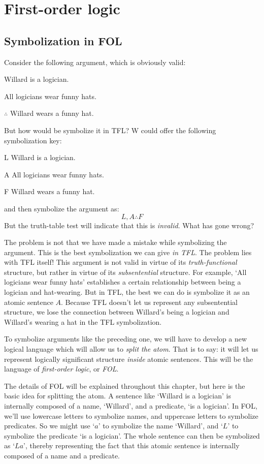 \part{First-order logic}\label{p:FOL}

\chapter{Symbolization in FOL}\label{ch:FOLSymbolization}


Consider the following argument, which is obviously valid:
\begin{earg}
\item[] Willard is a logician.
\item[] All logicians wear funny hats.
\item[$\therefore$] Willard wears a funny hat.
\end{earg}
But how would be symbolize it in TFL? W could offer the following symbolization key:
\begin{ekey}
\item[L] Willard is a logician.
\item[A] All logicians wear funny hats.
\item[F] Willard wears a funny hat.
\end{ekey}
and then symbolize the argument as:
$$L, A \therefore F$$
But the truth-table test will indicate that this is \emph{invalid}. What has gone wrong?

The problem is not that we have made a mistake while symbolizing the argument. This is the best symbolization we can give \emph{in TFL}. The problem lies with TFL itself! This argument is not valid in virtue of its \emph{truth-functional} structure, but rather in virtue of its \emph{subsentential} structure.  For example, `All logicians wear funny hats' establishes a certain relationship between being a logician and hat-wearing. But in TFL, the best we can do is symbolize it as an atomic sentence $A$.  Because TFL doesn't let us represent any subsentential structure, we lose the connection between Willard's being a logician and Willard's wearing a hat in the TFL symbolization.

To symbolize arguments like the preceding one, we will have to develop a new logical language which will allow us to \emph{split the atom}.  That is to say: it will let us represent logically significant structure \emph{inside} atomic sentences. This will be the language of \emph{first-order logic}, or \emph{FOL}.

The details of FOL will be explained throughout this chapter, but here is the basic idea for splitting the atom.  A sentence like `Willard is a logician' is internally composed of a name, `Willard', and a predicate, `\blank is a logician'.  In FOL, we'll use lowercase letters to symbolize names, and uppercase letters to symbolize predicates.  So we might use `$a$' to symbolize the name `Willard', and `$L$' to symbolize the predicate `\blank is a logician'.  The whole sentence can then be symbolized as `$La$', thereby representing the fact that this atomic sentence is internally composed of a name and a predicate.

